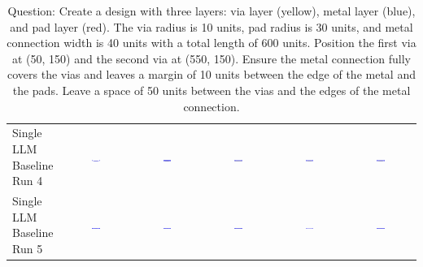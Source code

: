 \begin{table}
\begin{tabular}{@{}lccccc@{}}
    \makecell{Single LLM \\ Baseline \\ Run 4} & \includegraphics[width=0.13\textwidth]{./run_4/png/gpt-4o_results/ViaConnection.png} & \includegraphics[width=0.13\textwidth]{./run_4/png/o1-preview_results/ViaConnection.png} & \includegraphics[width=0.13\textwidth]{./run_4/png/claude-3-5-sonnet-20240620_results/ViaConnection.png} & \includegraphics[width=0.13\textwidth]{./run_4/png/watsonx_meta-llama_llama-3-1-70b-instruct_results/ViaConnection.png} & \includegraphics[width=0.13\textwidth]{./run_4/png/watsonx_meta-llama_llama-3-405b-instruct_results/ViaConnection.png} \\
    \makecell{Single LLM \\ Baseline \\ Run 5} & \includegraphics[width=0.13\textwidth]{./run_5/png/gpt-4o_results/ViaConnection.png} & \includegraphics[width=0.13\textwidth]{./run_5/png/o1-preview_results/ViaConnection.png} & \includegraphics[width=0.13\textwidth]{./run_5/png/claude-3-5-sonnet-20240620_results/ViaConnection.png} & \includegraphics[width=0.13\textwidth]{./run_5/png/watsonx_meta-llama_llama-3-1-70b-instruct_results/ViaConnection.png} & \includegraphics[width=0.13\textwidth]{./run_5/png/watsonx_meta-llama_llama-3-405b-instruct_results/ViaConnection.png} \\
    \bottomrule
  \end{tabular}
  \caption*{Question: Create a design with three layers: via layer (yellow), metal layer (blue), and pad layer (red). The via radius is 10 units, pad radius is 30 units, and metal connection width is 40 units with a total length of 600 units. Position the first via at (50, 150) and the second via at (550, 150). Ensure the metal connection fully covers the vias and leaves a margin of 10 units between the edge of the metal and the pads. Leave a space of 50 units between the vias and the edges of the metal connection.}
\end{table}

